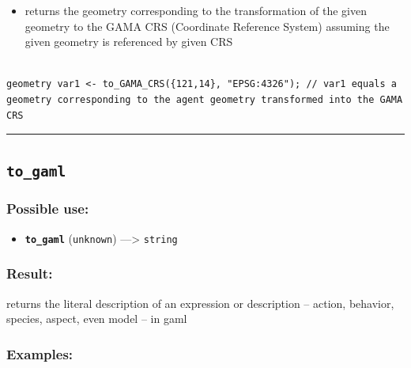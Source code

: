 \documentclass[]{book}
\providecommand{\tightlist}{%
  \setlength{\itemsep}{0pt}\setlength{\parskip}{0pt}}
\theoremstyle{definition}
\theoremstyle{definition}
\theoremstyle{definition}
\theoremstyle{remark}
\begin{document}
\begin{itemize}
\tightlist
\item
  returns the geometry corresponding to the transformation of the given
  geometry to the GAMA CRS (Coordinate Reference System) assuming the
  given geometry is referenced by given CRS
\end{itemize}

\begin{verbatim}
 
geometry var1 <- to_GAMA_CRS({121,14}, "EPSG:4326"); // var1 equals a geometry corresponding to the agent geometry transformed into the GAMA CRS
\end{verbatim}

\begin{center}\rule{0.5\linewidth}{\linethickness}\end{center}

\subsection{\texorpdfstring{\texttt{to\_gaml}}{to\_gaml}}\label{to_gaml}

\subsubsection{Possible use:}\label{possible-use-521}

\begin{itemize}
\tightlist
\item
  \textbf{\texttt{to\_gaml}} (\texttt{unknown}) ---\textgreater{}
  \texttt{string}
\end{itemize}

\subsubsection{Result:}\label{result-503}

returns the literal description of an expression or description --
action, behavior, species, aspect, even model -- in gaml

\subsubsection{Examples:}\label{examples-359}
\end{document}
